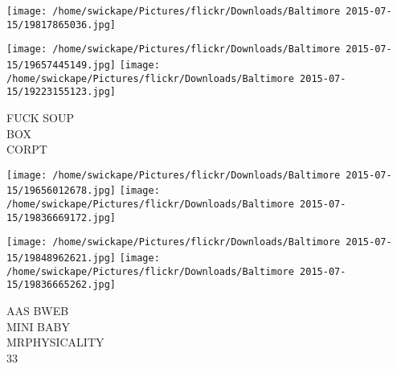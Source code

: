 \documentclass[10pt,letterpaper]{article}
\begin{document}
\texttt{[image: /home/swickape/Pictures/flickr/Downloads/Baltimore 2015-07-15/19817865036.jpg]}

\vspace{0.25in}
\texttt{[image: /home/swickape/Pictures/flickr/Downloads/Baltimore 2015-07-15/19657445149.jpg]}
\texttt{[image: /home/swickape/Pictures/flickr/Downloads/Baltimore 2015-07-15/19223155123.jpg]}

FUCK SOUP\\
BOX\\
CORPT\\
\pagebreak

\texttt{[image: /home/swickape/Pictures/flickr/Downloads/Baltimore 2015-07-15/19656012678.jpg]}
\texttt{[image: /home/swickape/Pictures/flickr/Downloads/Baltimore 2015-07-15/19836669172.jpg]}

\texttt{[image: /home/swickape/Pictures/flickr/Downloads/Baltimore 2015-07-15/19848962621.jpg]}
\texttt{[image: /home/swickape/Pictures/flickr/Downloads/Baltimore 2015-07-15/19836665262.jpg]}

AAS BWEB\\
MINI BABY\\
MRPHYSICALITY\\
33\\
\pagebreak
\end{document}
